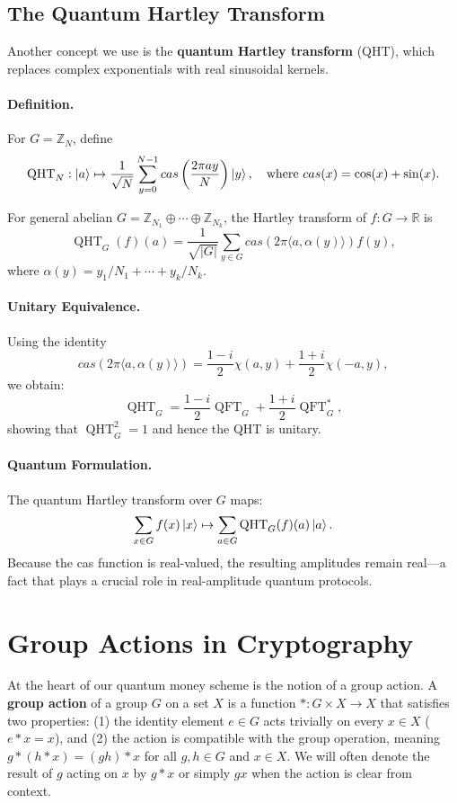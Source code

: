 \documentclass[12pt]{report}
\begin{document}
\subsection{The Quantum Hartley Transform}

Another concept we use is the \textbf{quantum Hartley transform} (QHT), which replaces complex exponentials with real sinusoidal kernels.

\paragraph{Definition.}
For $G = \mathbb{Z}_N$, define
\[
\operatorname{QHT}_N: \ket{a} \mapsto \frac{1}{\sqrt{N}} \sum_{y = 0}^{N - 1} cas\left(\frac{2\pi a y}{N}\right) \ket{y}, \quad \text{where } cas(x) = \cos(x) + \sin(x).
\]

For general abelian $G = \mathbb{Z}_{N_1} \oplus \cdots \oplus \mathbb{Z}_{N_k}$, the Hartley transform of $f : G \to \mathbb{R}$ is
\begin{equation}
    \operatorname{QHT}_G(f)({a}) = \frac{1}{\sqrt{|G|}} \sum_{{y} \in G} cas(2\pi \langle {a}, \alpha({y}) \rangle) f({y}),
\end{equation}
where $\alpha({y}) = y_1 / N_1 + \cdots + y_k / N_k$.

\paragraph{Unitary Equivalence.}
Using the identity
\[
cas(2\pi \langle {a}, \alpha({y}) \rangle) = \frac{1 - i}{2}\chi({a}, {y}) + \frac{1 + i}{2}\chi(-{a}, {y}),
\]
we obtain:
\begin{equation}
\operatorname{QHT}_G = \frac{1 - i}{2} \operatorname{QFT}_G + \frac{1 + i}{2} \operatorname{QFT}_G^*,
\end{equation}
showing that $\operatorname{QHT}_G^2 = {1}$ and hence the QHT is unitary.

\paragraph{Quantum Formulation.}
The quantum Hartley transform over $G$ maps:
\[
\sum_{{x} \in G} f({x}) \ket{{x}} \mapsto \sum_{{a} \in G} \operatorname{QHT}_G(f)({a}) \ket{{a}}.
\]
Because the cas function is real-valued, the resulting amplitudes remain real—a fact that plays a crucial role in real-amplitude quantum protocols.


\section{Group Actions in Cryptography}
At the heart of our quantum money scheme is the notion of a group action. A \textbf{group action} of a group $G$ on a set $X$ is a function $*\colon G \times X \to X$ that satisfies two properties: (1) the identity element $e \in G$ acts trivially on every $x \in X$ ($e * x = x$), and (2) the action is compatible with the group operation, meaning $g*(h* x) = (gh)*x$ for all $g,h \in G$ and $x \in X$. We will often denote the result of $g$ acting on $x$ by $g*x$ or simply $g x$ when the action is clear from context.
\end{document}
